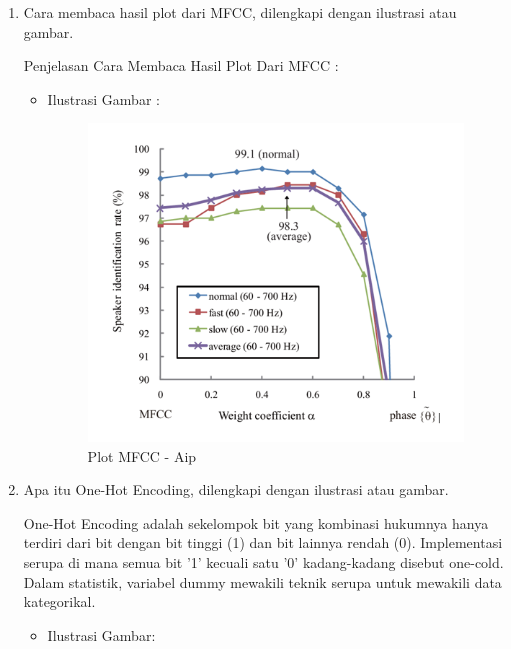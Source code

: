 \begin{enumerate}
\begin{itemize}
\begin{itemize}
\end{itemize}
\end{itemize}

\item Cara membaca hasil plot dari MFCC, dilengkapi dengan ilustrasi atau gambar.

Penjelasan Cara Membaca Hasil Plot Dari MFCC :
\begin{itemize}
\item Ilustrasi Gambar :
\begin{figure}[!hbtp]
\centering
\includegraphics[scale=0.4]{figures/AIP/f5.PNG}
\caption{Plot MFCC - Aip}
\label{Plot MFCC - Aip}
\end{figure}

\end{itemize}

\item Apa itu One-Hot Encoding, dilengkapi dengan ilustrasi atau gambar.


One-Hot Encoding adalah sekelompok bit yang kombinasi hukumnya hanya terdiri dari bit dengan bit tinggi (1) dan bit lainnya rendah (0). Implementasi serupa di mana semua bit '1' kecuali satu '0' kadang-kadang disebut one-cold. Dalam statistik, variabel dummy mewakili teknik serupa untuk mewakili data kategorikal.
\begin{itemize}
\item Ilustrasi Gambar:


\end{itemize}
\end{enumerate}
